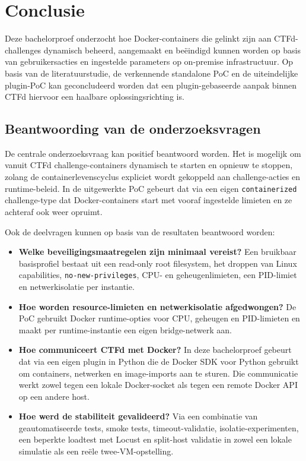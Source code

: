 
\chapter{Conclusie}%
\label{ch:conclusie}

Deze bachelorproef onderzocht hoe Docker-containers die gelinkt zijn aan CTFd-challenges dynamisch beheerd, aangemaakt en beëindigd kunnen worden op basis van gebruikersacties en ingestelde parameters op on-premise infrastructuur. Op basis van de literatuurstudie, de verkennende standalone PoC en de uiteindelijke plugin-PoC kan geconcludeerd worden dat een plugin-gebaseerde aanpak binnen CTFd hiervoor een haalbare oplossingsrichting is.

\section{Beantwoording van de onderzoeksvragen}%
\label{sec:conclusie-onderzoeksvragen}

De centrale onderzoeksvraag kan positief beantwoord worden. Het is mogelijk om vanuit CTFd challenge-containers dynamisch te starten en opnieuw te stoppen, zolang de containerlevenscyclus expliciet wordt gekoppeld aan challenge-acties en runtime-beleid. In de uitgewerkte PoC gebeurt dat via een eigen \texttt{containerized} challenge-type dat Docker-containers start met vooraf ingestelde limieten en ze achteraf ook weer opruimt.

Ook de deelvragen kunnen op basis van de resultaten beantwoord worden:

\begin{itemize}
  \item \textbf{Welke beveiligingsmaatregelen zijn minimaal vereist?} Een bruikbaar basisprofiel bestaat uit een read-only root filesystem, het droppen van Linux capabilities, \texttt{no-new-privileges}, CPU- en geheugenlimieten, een PID-limiet en netwerkisolatie per instantie.
  \item \textbf{Hoe worden resource-limieten en netwerkisolatie afgedwongen?} De PoC gebruikt Docker runtime-opties voor CPU, geheugen en PID-limieten en maakt per runtime-instantie een eigen bridge-netwerk aan.
  \item \textbf{Hoe communiceert CTFd met Docker?} In deze bachelorproef gebeurt dat via een eigen plugin in Python die de Docker SDK voor Python gebruikt om containers, netwerken en image-imports aan te sturen. Die communicatie werkt zowel tegen een lokale Docker-socket als tegen een remote Docker API op een andere host.
  \item \textbf{Hoe werd de stabiliteit gevalideerd?} Via een combinatie van geautomatiseerde tests, smoke tests, timeout-validatie, isolatie-experimenten, een beperkte loadtest met Locust en split-host validatie in zowel een lokale simulatie als een reële twee-VM-opstelling.
\end{itemize}


